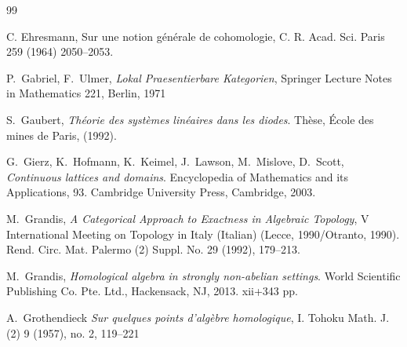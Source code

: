 \documentclass[12pt]{article}
\begin{document}
\begin{thebibliography}{99}
 
 C. Ehresmann, Sur une notion g\' en\' erale de cohomologie, C. R. Acad. Sci. Paris 259 (1964) 2050--2053.




 P.~Gabriel, F.~Ulmer, {\em Lokal Praesentierbare Kategorien},  Springer Lecture Notes in Mathematics 221, Berlin, 1971

  S.~Gaubert, {\em Th\'eorie des syst\`emes lin\'eaires dans les diodes}. Th\`ese, \' Ecole des mines de Paris, (1992).





 G.~Gierz, K.~Hofmann, K.~Keimel,  J.~Lawson, M.~Mislove, D.~Scott, {\em 
Continuous lattices and domains}. 
Encyclopedia of Mathematics and its Applications, 93. Cambridge University Press, Cambridge, 2003. 




  M.~Grandis, {\em A Categorical Approach to Exactness in Algebraic Topology}, V International Meeting on Topology in Italy (Italian) (Lecce, 1990/Otranto, 1990). 
Rend. Circ. Mat. Palermo (2) Suppl. No. 29 (1992), 179--213. 

  M.~Grandis,  {\em Homological algebra in strongly non-abelian settings}. World Scientific Publishing Co. Pte. Ltd., Hackensack, NJ, 2013. xii+343 pp.

 A.~Grothendieck {\em  Sur quelques points d'alg\`ebre homologique}, I. Tohoku Math. J. (2) 9 (1957), no. 2, 119--221









\end{thebibliography}
\end{document}
